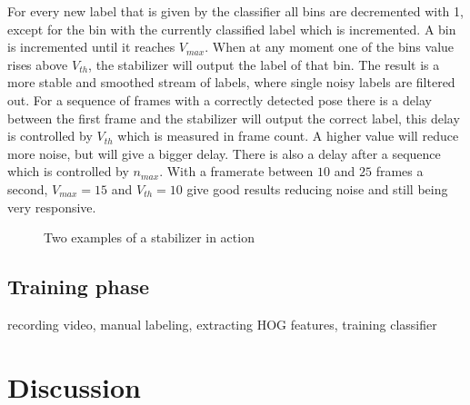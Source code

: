 For every new label that is given by the classifier all bins are decremented with 1, except for the bin with the currently classified label which is incremented. A bin is incremented until it reaches $V_{max}$. When at any moment one of the bins value rises above $V_{th}$, the stabilizer will output the label of that bin. The result is a more stable and smoothed stream of labels, where single noisy labels are filtered out. For a sequence of frames with a correctly detected pose there is a delay between the first frame and the stabilizer will output the correct label, this delay is controlled by $V_{th}$ which is measured in frame count. A higher value will reduce more noise, but will give a bigger delay. There is also a delay after a sequence which is controlled by $n_{max}$. With a framerate between $10$ and $25$ frames a second, $V_{max} = 15$ and $V_{th} = 10$ give good results reducing noise and still being very responsive.

\begin{figure}[htbp]
  \centering
{}
\hspace{0.03\linewidth}
  \caption{Two examples of a stabilizer in action}
  \label{fig:stabilizer}
\end{figure}




\subsection*{Training phase}
recording video, manual labeling, extracting HOG features, training classifier

\section{Discussion}
